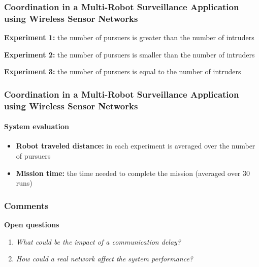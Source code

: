 \begin{frame}
	\frametitle{Coordination in a Multi-Robot Surveillance Application using Wireless Sensor Networks}
	
	\textbf{Experiment 1:} the number of pursuers is greater than the number of intruders
	
	\vspace{0.4cm}
	
	\textbf{Experiment 2:} the number of pursuers is smaller than the number of intruders
	
	\vspace{0.4cm}
	
	\textbf{Experiment 3:} the number of pursuers is equal to the number of intruders
\end{frame}

\begin{frame}
	\frametitle{Coordination in a Multi-Robot Surveillance Application using Wireless Sensor Networks}
	\framesubtitle{System evaluation}
	
	\begin{itemize}
		\item \textbf{Robot traveled distance:} in each experiment is averaged over the number of pursuers
		
		\vspace{0.3cm}
		
		\item \textbf{Mission time:} the time needed to complete the mission (averaged over 30 runs)
	\end{itemize}
\end{frame}

\begin{frame}
	\frametitle{Comments}
	
	\textbf{Open questions}
	
	\begin{enumerate}
		\item \emph{What could be the impact of a communication delay?}
		
		\item \emph{How could a real network affect the system performance?}
	\end{enumerate}
\end{frame}

